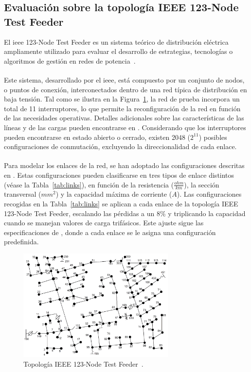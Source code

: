\subsection{Evaluación sobre la topología IEEE 123-Node Test Feeder}

El \gls{ieee} 123-Node Test Feeder es un sistema teórico de distribución eléctrica ampliamente utilizado para evaluar el desarrollo de estrategias, tecnologías o algoritmos de gestión en redes de potencia~\cite{Schneider17}.\\
\\
Este sistema, desarrollado por el \gls{ieee}, está compuesto por un conjunto de nodos, o puntos de conexión, interconectados dentro de una red típica de distribución en baja tensión. Tal como se ilustra en la Figura~\ref{fig:ieeeNodeTestFeeder}, la red de prueba incorpora un total de 11 interruptores, lo que permite la reconfiguración de la red en función de las necesidades operativas. Detalles adicionales sobre las características de las líneas y de las cargas pueden encontrarse en \cite{Schneider17}. Considerando que los interruptores pueden encontrarse en estado abierto o cerrado, existen 2048 ($2^{11}$) posibles configuraciones de conmutación, excluyendo la direccionalidad de cada enlace. \\
\\
Para modelar los enlaces de la red, se han adoptado las configuraciones descritas en \cite{Schneider17}. Estas configuraciones pueden clasificarse en tres tipos de enlace distintos (véase la Tabla~\ref{tab:links}), en función de la resistencia ($\frac{ohm}{km}$), la sección transversal ($mm^{2}$) y la capacidad máxima de corriente ($A$). Las configuraciones recogidas en la Tabla~\ref{tab:links} se aplican a cada enlace de la topología IEEE 123-Node Test Feeder, escalando las pérdidas a un 8\% y triplicando la capacidad cuando se manejan valores de carga trifásicos. Este ajuste sigue las especificaciones de \cite{Schneider17}, donde a cada enlace se le asigna una configuración predefinida.\\


\begin{figure}[ht!]
    \centering
    \includegraphics[width=0.7\textwidth]{fig/07_bloste/bloste_05.png}
    \caption{Topología IEEE 123-Node Test Feeder~\cite{Schneider17}.}
    \label{fig:ieeeNodeTestFeeder}
\end{figure}


